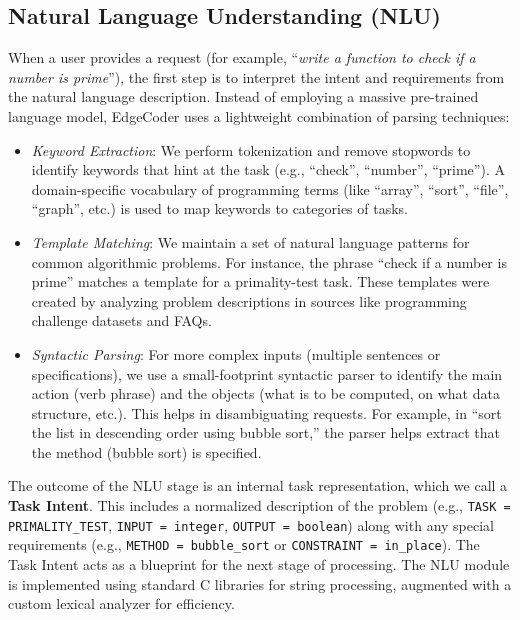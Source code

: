 \documentclass[12pt]{article}
\begin{document}
\subsection{Natural Language Understanding (NLU)}
When a user provides a request (for example, “\textit{write a function to check if a number is prime}”), the first step is to interpret the intent and requirements from the natural language description. Instead of employing a massive pre-trained language model, EdgeCoder uses a lightweight combination of parsing techniques:
\begin{itemize}
    \item \textit{Keyword Extraction}: We perform tokenization and remove stopwords to identify keywords that hint at the task (e.g., “check”, “number”, “prime”). A domain-specific vocabulary of programming terms (like “array”, “sort”, “file”, “graph”, etc.) is used to map keywords to categories of tasks.
    \item \textit{Template Matching}: We maintain a set of natural language patterns for common algorithmic problems. For instance, the phrase “check if a number is prime” matches a template for a primality-test task. These templates were created by analyzing problem descriptions in sources like programming challenge datasets and FAQs.
    \item \textit{Syntactic Parsing}: For more complex inputs (multiple sentences or specifications), we use a small-footprint syntactic parser to identify the main action (verb phrase) and the objects (what is to be computed, on what data structure, etc.). This helps in disambiguating requests. For example, in “sort the list in descending order using bubble sort,” the parser helps extract that the method (bubble sort) is specified.
\end{itemize}
The outcome of the NLU stage is an internal task representation, which we call a \textbf{Task Intent}. This includes a normalized description of the problem (e.g., \texttt{TASK = PRIMALITY\_TEST}, \texttt{INPUT = integer}, \texttt{OUTPUT = boolean}) along with any special requirements (e.g., \texttt{METHOD = bubble\_sort} or \texttt{CONSTRAINT = in\_place}). The Task Intent acts as a blueprint for the next stage of processing. The NLU module is implemented using standard C libraries for string processing, augmented with a custom lexical analyzer for efficiency.
\end{document}
